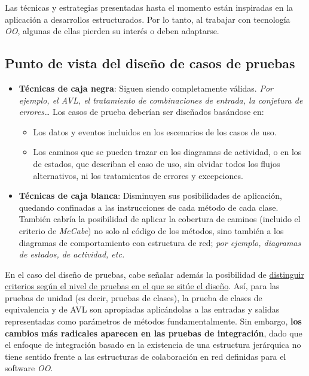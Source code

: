 Las técnicas y estrategias presentadas hasta el momento están inspiradas en la aplicación a desarrollos estructurados. Por lo tanto, al trabajar con tecnología \textit{OO}, algunas de ellas pierden su interés o deben adaptarse.\\

\subsection{Punto de vista del diseño de casos de pruebas}

\begin{itemize}
    \item \textbf{Técnicas de caja negra}: Siguen siendo completamente válidas. \textit{Por ejemplo, el AVL, el tratamiento de combinaciones de entrada, la conjetura de errores\ldots} Los casos de prueba deberían ser diseñados basándose en:
          \begin{itemize}
              \item Los datos y eventos incluidos en los escenarios de los casos de uso.
              \item Los caminos que se pueden trazar en los diagramas de actividad, o en los de estados, que describan el caso de uso, sin olvidar todos los flujos alternativos, ni los tratamientos de errores y excepciones.
          \end{itemize}
    \item \textbf{Técnicas de caja blanca}: Disminuyen sus posibilidades de aplicación, quedando confinadas a las instrucciones de cada método de cada clase. También cabría la posibilidad de aplicar la cobertura de caminos (incluido el criterio de \textit{McCabe}) no solo al código de los métodos, sino también a los diagramas de comportamiento con estructura de red; \textit{por ejemplo, diagramas de estados, de actividad, etc.}
\end{itemize}

En el caso del diseño de pruebas, cabe señalar además la posibilidad de \uline{distinguir criterios según el nivel de pruebas en el que se sitúe el diseño}. Así, para las pruebas de unidad (es decir, pruebas de clases), la prueba de clases de equivalencia y de AVL  son apropiadas aplicándolas a las entradas y salidas representadas como parámetros de métodos fundamentalmente. Sin embargo, \textbf{los cambios más radicales aparecen en las pruebas de integración}, dado que el enfoque de integración basado en la existencia de una estructura jerárquica no tiene sentido frente a las estructuras de colaboración en red definidas para el software \textit{OO}.\\

